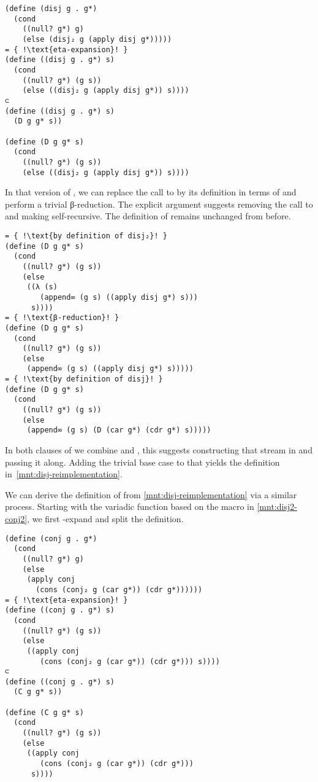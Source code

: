 \documentclass[runningheads,natbib=false]{llncs}
\begin{document}
\begin{verbatim}
(define (disj g . g*)
  (cond
    ((null? g*) g)
    (else (disj₂ g (apply disj g*)))))
= { !\text{eta-expansion}! }
(define ((disj g . g*) s)
  (cond
    ((null? g*) (g s))
    (else ((disj₂ g (apply disj g*)) s))))
⊂
(define ((disj g . g*) s)
  (D g g* s))

(define (D g g* s)
  (cond
    ((null? g*) (g s))
    (else ((disj₂ g (apply disj g*)) s))))
\end{verbatim}

In that version of , we can replace the call to
 by its definition in terms of 
and perform a trivial β-reduction. The explicit 
argument suggests removing the call to  and making
 self-recursive. The definition of 
remains unchanged from before.

\begin{verbatim}
= { !\text{by definition of disj₂}! }
(define (D g g* s)
  (cond
    ((null? g*) (g s))
    (else
     ((λ (s)
        (append∞ (g s) ((apply disj g*) s)))
      s))))
= { !\text{β-reduction}! }
(define (D g g* s)
  (cond
    ((null? g*) (g s))
    (else
     (append∞ (g s) ((apply disj g*) s)))))
= { !\text{by definition of disj}! }
(define (D g g* s)
  (cond
    ((null? g*) (g s))
    (else
     (append∞ (g s) (D (car g*) (cdr g*) s)))))
\end{verbatim}

In both clauses of  we combine  and
, this suggests constructing that stream in
 and passing it along. Adding the trivial base case
to that  yields the definition
in~\cref{mnt:disj-reimplementation}.

We can derive the definition of  from
\cref{mnt:disj-reimplementation} via a similar process. Starting with
the variadic function based on the macro in \cref{mnt:disj2-conj2}, we
first \texteta{}-expand and split the definition.

\begin{verbatim}
(define (conj g . g*)
  (cond
    ((null? g*) g)
    (else
     (apply conj
       (cons (conj₂ g (car g*)) (cdr g*))))))
= { !\text{eta-expansion}! }
(define ((conj g . g*) s)
  (cond
    ((null? g*) (g s))
    (else
     ((apply conj
        (cons (conj₂ g (car g*)) (cdr g*))) s))))
⊂
(define ((conj g . g*) s)
  (C g g* s))

(define (C g g* s)
  (cond
    ((null? g*) (g s))
    (else
     ((apply conj
        (cons (conj₂ g (car g*)) (cdr g*)))
      s))))
\end{verbatim}
\end{document}

